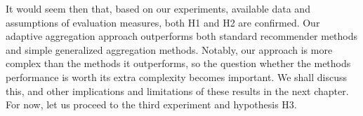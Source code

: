It would seem then that, based on our experiments, available data
and assumptions of evaluation measures, both H1 and H2 are confirmed.
Our adaptive aggregation approach outperforms both standard recommender
methods and simple generalized aggregation methods.
Notably, our approach is more complex than the methods it outperforms,
so the question whether the methods performance is worth its extra complexity becomes important.
We shall discuss this, and other implications and limitations of these results in the next chapter.
For now, let us proceed to the third experiment and hypothesis H3.

